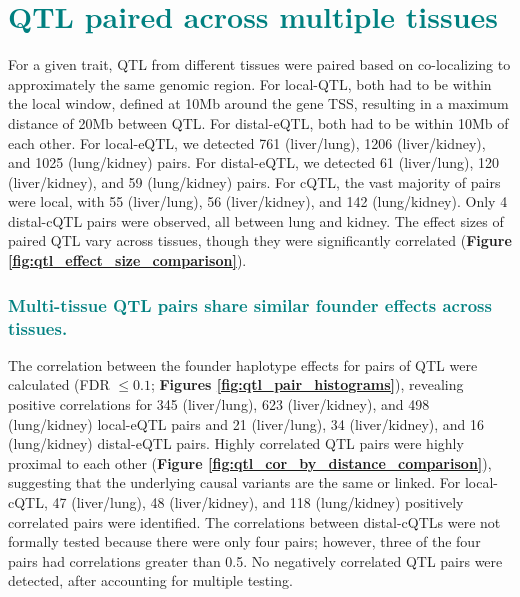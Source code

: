 \documentclass[9pt,twocolumn,twoside]{gsajnl}
\newcommand{\WV}[2]{\textcolor{red}{#1\footnote{\textcolor{red}{WV: #2}}}}
\newcommand{\GKinline}[1]{\textcolor{teal}{#1}}
\begin{document}
\section{\GKinline{QTL paired across multiple tissues}}


For a given trait, QTL from different tissues were paired based on co-localizing to approximately the same genomic region. For local-QTL, both had to be within the local window, defined at 10Mb around the gene TSS, resulting in a maximum distance of 20Mb between QTL. For distal-eQTL, both had to be within 10Mb of each other. 
For local-eQTL, we detected 761 (liver/lung), 1206 (liver/kidney), and 1025 (lung/kidney) pairs. For distal-eQTL, we detected 61 (liver/lung), 120 (liver/kidney), and 59 (lung/kidney) pairs. For cQTL, the vast majority of pairs were local, with 55 (liver/lung), 56 (liver/kidney), and 142 (lung/kidney). Only 4 distal-cQTL pairs were observed, all between lung and kidney. The effect sizes of paired QTL vary across tissues, though they were significantly correlated (\textbf{Figure \ref{fig:qtl_effect_size_comparison}}).

\subsubsection{\GKinline{Multi-tissue QTL pairs share similar founder effects across tissues.}}
The correlation between the founder haplotype effects for pairs of QTL were calculated (FDR $\le 0.1$; \textbf{Figures \ref{fig:qtl_pair_histograms}}), revealing positive correlations for 345 (liver/lung), 623 (liver/kidney), and 498 (lung/kidney) local-eQTL pairs and 21 (liver/lung), 34 (liver/kidney), and 16 (lung/kidney) distal-eQTL pairs. Highly correlated QTL pairs were highly proximal to each other (\textbf{Figure \ref{fig:qtl_cor_by_distance_comparison}}), suggesting that the underlying causal variants are the same or linked. For local-cQTL, 47 (liver/lung), 48 (liver/kidney), and 118 (lung/kidney) positively correlated pairs were identified. The correlations between distal-cQTLs were not formally tested because there were only four pairs; however, three of the four pairs had correlations greater than 0.5. No negatively correlated QTL pairs were detected, after accounting for multiple testing.
\end{document}

